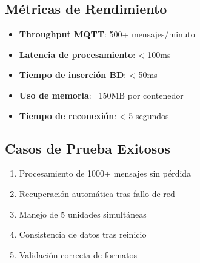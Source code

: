 \subsection{Métricas de Rendimiento}

\begin{itemize}[noitemsep]
    \item \textbf{Throughput MQTT}: 500+ mensajes/minuto
    \item \textbf{Latencia de procesamiento}: < 100ms
    \item \textbf{Tiempo de inserción BD}: < 50ms
    \item \textbf{Uso de memoria}: ~150MB por contenedor
    \item \textbf{Tiempo de reconexión}: < 5 segundos
\end{itemize}

\subsection{Casos de Prueba Exitosos}

\begin{enumerate}[noitemsep]
    \item Procesamiento de 1000+ mensajes sin pérdida
    \item Recuperación automática tras fallo de red
    \item Manejo de 5 unidades simultáneas
    \item Consistencia de datos tras reinicio
    \item Validación correcta de formatos
\end{enumerate}